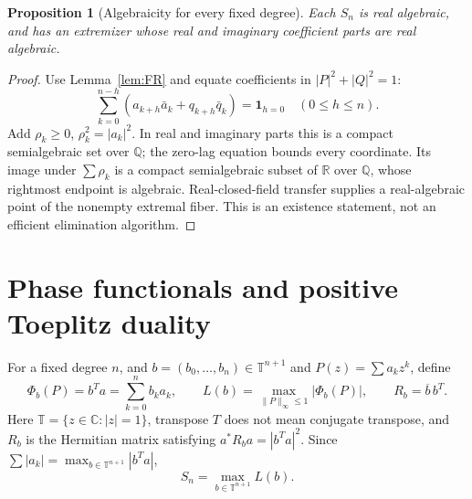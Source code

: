 \documentclass[11pt]{article}
\newtheorem{proposition}[theorem]{Proposition}
\newcommand{\T}{\mathbb T}
\newcommand{\C}{\mathbb C}
\newcommand{\R}{\mathbb R}
\newcommand{\Q}{\mathbb Q}
\begin{document}
\begin{proposition}[Algebraicity for every fixed degree]\label{prop:algebraicity}
Each $S_n$ is real algebraic, and has an extremizer whose real and
imaginary coefficient parts are real algebraic.
\end{proposition}
\begin{proof}
Use Lemma~\ref{lem:FR} and equate coefficients in $|P|^2+|Q|^2=1$:
\[
 \sum_{k=0}^{n-h}(a_{k+h}\bar a_k+q_{k+h}\bar q_k)=\mathbf1_{h=0}
 \quad(0\le h\le n).
\]
Add $\rho_k\ge0$, $\rho_k^2=|a_k|^2$. In real and imaginary parts this
is a compact semialgebraic set over $\Q$; the zero-lag equation bounds
every coordinate. Its image under $\sum\rho_k$ is a compact
semialgebraic subset of $\R$ over $\Q$, whose rightmost endpoint is
algebraic. Real-closed-field transfer supplies a real-algebraic point of
the nonempty extremal fiber. This is an existence statement, not an
efficient elimination algorithm.
\end{proof}


\section{Phase functionals and positive Toeplitz duality}\label{sec:Toeplitz}

For a fixed degree $n$, and $b=(b_0,\ldots,b_n)\in\T^{n+1}$ and $P(z)=\sum a_kz^k$, define
\begin{equation}\label{eq:phasefunctional}
 \Phi_b(P)=b^Ta=\sum_{k=0}^nb_ka_k,\qquad
 L(b)=\max_{\|P\|_\infty\le1}|\Phi_b(P)|,\qquad
 R_b=\overline b\,b^T.
\end{equation}
Here $\T=\{z\in\C:|z|=1\}$, transpose $T$ does not mean conjugate transpose, and $R_b$ is the Hermitian matrix satisfying $a^*R_ba=|b^Ta|^2$. Since $\sum|a_k|=\max_{b\in\T^{n+1}}|b^Ta|$,
\begin{equation}\label{eq:smax}
 S_n=\max_{b\in\T^{n+1}}L(b).
\end{equation}
\end{document}
